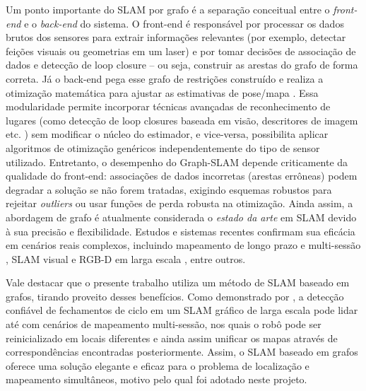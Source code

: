         Um ponto importante do SLAM por grafo é a separação conceitual entre o \textit{front-end} e o \textit{back-end} do sistema. O front-end é responsável por processar os dados brutos dos sensores para extrair informações relevantes (por exemplo, detectar feições visuais ou geometrias em um laser) e por tomar decisões de associação de dados e detecção de loop closure – ou seja, construir as arestas do grafo de forma correta. Já o back-end pega esse grafo de restrições construído e realiza a otimização matemática para ajustar as estimativas de pose/mapa \cite{Cadena2016}. Essa modularidade permite incorporar técnicas avançadas de reconhecimento de lugares (como detecção de loop closures baseada em visão, descritores de imagem etc. \cite{Labbe2014}) sem modificar o núcleo do estimador, e vice-versa, possibilita aplicar algoritmos de otimização genéricos independentemente do tipo de sensor utilizado. Entretanto, o desempenho do Graph-SLAM depende criticamente da qualidade do front-end: associações de dados incorretas (arestas errôneas) podem degradar a solução se não forem tratadas, exigindo esquemas robustos para rejeitar \textit{outliers} ou usar funções de perda robusta na otimização. Ainda assim, a abordagem de grafo é atualmente considerada o \textit{estado da arte} em SLAM devido à sua precisão e flexibilidade. Estudos e sistemas recentes confirmam sua eficácia em cenários reais complexos, incluindo mapeamento de longo prazo e multi-sessão \cite{Labbe2014}, SLAM visual e RGB-D em larga escala \cite{MurArtal2017}\cite{Zhang2021}, entre outros. 
        
        Vale destacar que o presente trabalho utiliza um método de SLAM baseado em grafos, tirando proveito desses benefícios. Como demonstrado por , a detecção confiável de fechamentos de ciclo em um SLAM gráfico de larga escala pode lidar até com cenários de mapeamento multi-sessão, nos quais o robô pode ser reinicializado em locais diferentes e ainda assim unificar os mapas através de correspondências encontradas posteriormente. Assim, o SLAM baseado em grafos oferece uma solução elegante e eficaz para o problema de localização e mapeamento simultâneos, motivo pelo qual foi adotado neste projeto. 

